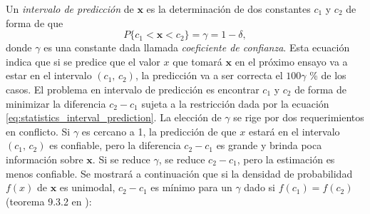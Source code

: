 \documentclass[a4paper]{report}
\newcommand{\x}{\mathbf{x}}
\begin{document}
Un \emph{intervalo de predicción} de \(\x\) es la determinación de dos constantes \(c_1\) y \(c_2\) de forma de que
\begin{equation}\label{eq:statistics_interval_prediction}
  P\{c_1<\x<c_2\}=\gamma=1-\delta,
\end{equation}
donde \(\gamma\) es una constante dada llamada \emph{coeficiente de confianza}. Esta ecuación indica que si se predice que el valor \(x\) que tomará \(\x\) en el próximo ensayo va a estar en el intervalo \((c_1,\,c_2)\), la predicción va a ser correcta el \(100\gamma\) \% de los casos. El problema en intervalo de predicción es encontrar \(c_1\) y \(c_2\) de forma de minimizar la diferencia \(c_2-c_1\) sujeta a la restricción dada por la ecuación \ref{eq:statistics_interval_prediction}. La elección de \(\gamma\) se rige por dos requerimientos en conflicto. Si \(\gamma\) es cercano a 1, la predicción de que \(x\) estará en el intervalo \((c_1,\,c_2)\) es confiable, pero la diferencia \(c_2-c_1\) es grande y brinda poca información sobre \(\x\). Si se reduce \(\gamma\), se reduce \(c_2-c_1\), pero la estimación es menos confiable. Se mostrará a continuación que si la densidad de probabilidad \(f(x)\) de \(\x\) es unimodal, \(c_2-c_1\) es mínimo para un \(\gamma\) dado si \(f(c_1)=f(c_2)\) (teorema 9.3.2 en \cite{casella2001statistical}):
\end{document}
